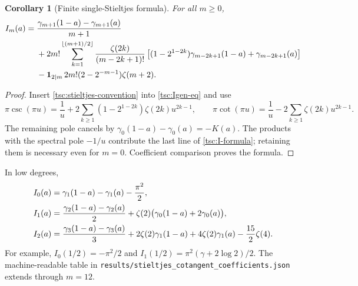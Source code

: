 \documentclass[11pt]{article}
\numberwithin{equation}{section}
\newtheorem{corollary}[theorem]{Corollary}
\theoremstyle{definition}\newtheorem{definition}[theorem]{Definition}
\theoremstyle{remark}\newtheorem{remark}[theorem]{Remark}
\newcommand{\src}[1]{\nolinkurl{#1}}
\begin{document}
\begin{corollary}[Finite single-Stieltjes formula]\label{tsc:Iexplicit}
For all $m\ge0$,
\begin{align}\label{tsc:I-formula}
 I_m(a)={}&\frac{\gamma_{m+1}(1-a)-\gamma_{m+1}(a)}{m+1}\notag\\
 &+2m!\sum_{k=1}^{\lfloor(m+1)/2\rfloor}
       \frac{\zeta(2k)}{(m-2k+1)!}
       \left[(1-2^{1-2k})\gamma_{m-2k+1}(1-a)
                       +\gamma_{m-2k+1}(a)\right]\notag\\
 &-\mathbf1_{2\mid m}\,2m!(2-2^{-m-1})\zeta(m+2).
\end{align}
\end{corollary}
\begin{proof}
Insert \eqref{tsc:stieltjes-convention} into \eqref{tsc:Igen-eq} and use
\[
 \pi\csc(\pi u)=\frac1u+
     2\sum_{k\ge1}(1-2^{1-2k})\zeta(2k)u^{2k-1},\qquad
 \pi\cot(\pi u)=\frac1u-2\sum_{k\ge1}\zeta(2k)u^{2k-1}.
\]
The remaining pole cancels by
$\gamma_0(1-a)-\gamma_0(a)=-K(a)$. The products with the spectral pole
$-1/u$ contribute the last line of \eqref{tsc:I-formula}; retaining them
is necessary even for $m=0$. Coefficient comparison proves the formula.
\end{proof}
In low degrees,
\begin{align}\label{tsc:Iexamples}
 I_0(a)&=\gamma_1(1-a)-\gamma_1(a)-\frac{\pi^2}{2},\notag\\
 I_1(a)&=\frac{\gamma_2(1-a)-\gamma_2(a)}2
           +\zeta(2)\bigl(\gamma_0(1-a)+2\gamma_0(a)\bigr),\notag\\
 I_2(a)&=\frac{\gamma_3(1-a)-\gamma_3(a)}3
       +2\zeta(2)\gamma_1(1-a)+4\zeta(2)\gamma_1(a)
       -\frac{15}{2}\zeta(4).
\end{align}
For example, $I_0(1/2)=-\pi^2/2$ and
$I_1(1/2)=\pi^2(\gamma+2\log2)/2$. The machine-readable table in
\src{results/stieltjes_cotangent_coefficients.json} extends through $m=12$.
\end{document}
